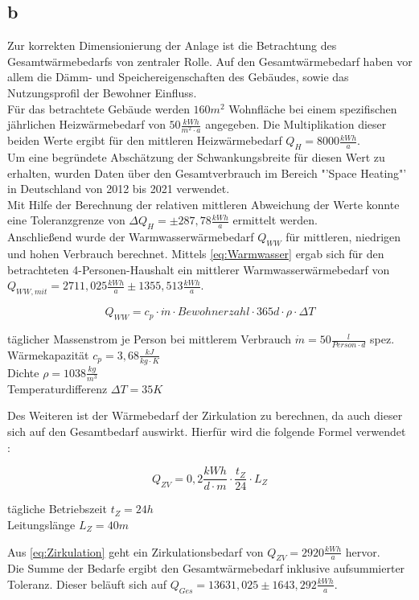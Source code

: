 \subsection{b}
Zur korrekten Dimensionierung der Anlage ist die Betrachtung des Gesamtwärmebedarfs von zentraler Rolle.
Auf den Gesamtwärmebedarf haben vor allem die Dämm- und Speichereigenschaften des Gebäudes, sowie das Nutzungsprofil der Bewohner Einfluss.\\
Für das betrachtete Gebäude werden $160 m^2$ Wohnfläche bei einem spezifischen jährlichen Heizwärmebedarf von $50 \frac{kWh}{m^2 \cdot a}$ angegeben.
Die Multiplikation dieser beiden Werte ergibt für den mittleren Heizwärmebedarf $Q_H = 8000 \frac{kWh}{a}$.\\
Um eine begründete Abschätzung der Schwankungsbreite für diesen Wert zu erhalten, wurden Daten über den Gesamtverbrauch im Bereich "'Space Heating"' in Deutschland von 2012 bis 2021 verwendet.\cite{EuroStat}\\
Mit Hilfe der Berechnung der relativen mittleren Abweichung der Werte konnte eine Toleranzgrenze von $\Delta Q_H = \pm 287,78 \frac{kWh}{a}$ ermittelt werden.\\
\newpage
Anschließend wurde der Warmwasserwärmebedarf $Q_{WW}$ für mittleren, niedrigen und hohen Verbrauch \cite[S.119]{Sick22} berechnet.
Mittels \autoref{eq:Warmwasser} ergab sich für den betrachteten 4-Personen-Haushalt ein mittlerer Warmwasserwärmebedarf von $Q_{WW,mit} = 2711,025 \frac{kWh}{a} \pm 1355,513 \frac{kWh}{a}$.

\begin{equation}
    Q_{WW}= c_p \cdot \dot{m} \cdot Bewohnerzahl  \cdot 365d \cdot \rho \cdot \Delta T
    \label{eq:Warmwasser}
\end{equation}
\vspace{\baselineskip}
\begin{center}
    täglicher Massenstrom je Person bei mittlerem Verbrauch $\dot{m}=50 \frac{l}{Person \cdot d}$
    spez. Wärmekapazität $c_p = 3,68 \frac{kJ}{kg \cdot K}$\\
    Dichte $\rho = 1038 \frac{kg}{m^3}$\\
    Temperaturdifferenz $\Delta T = 35 K$ 
\end{center}

Des Weiteren ist der Wärmebedarf der Zirkulation zu berechnen, da auch dieser sich auf den Gesamtbedarf auswirkt.
Hierfür wird die folgende Formel verwendet \cite[S.73]{Sick22}:

\begin{equation}
    Q_{ZV} = 0,2 \frac{kWh}{d \cdot m} \cdot \frac{t_Z}{24} \cdot L_Z
    \label{eq:Zirkulation}
\end{equation}
\begin{center}
    tägliche Betriebszeit $t_Z = 24 h$\\
    Leitungslänge $L_Z = 40 m$
\end{center}
\vspace{\baselineskip}
Aus \autoref{eq:Zirkulation} geht ein Zirkulationsbedarf von $Q_{ZV} = 2920 \frac{kWh}{a}$ hervor.\\
Die Summe der Bedarfe ergibt den Gesamtwärmebedarf inklusive aufsummierter Toleranz.
Dieser beläuft sich auf $Q_{Ges}=13631,025 \pm 1643,292 \frac{kWh}{a}$.